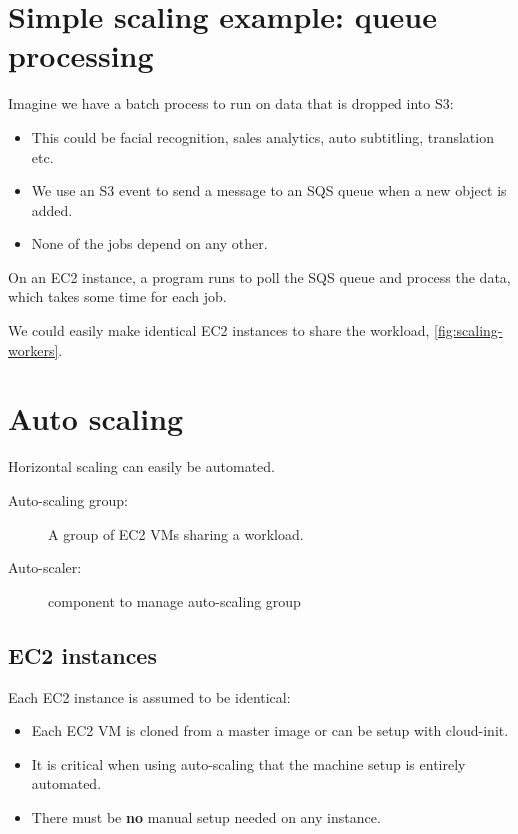 \documentclass[slides]{pgnotes}
\begin{document}
\section{Simple scaling example: queue processing}

Imagine we have a batch process to run on data that is dropped into S3:
\begin{itemize}
\item This could be facial recognition, sales analytics, auto subtitling, translation etc.
\item We use an S3 event to send a message to an SQS queue when a new object is added.
\item None of the jobs depend on any other.
\end{itemize}

On an EC2 instance, a program runs to poll the SQS queue and process the data, which takes some time for each job.


We could easily make identical EC2 instances to share the workload, \autoref{fig:scaling-workers}.


\section{Auto scaling}

Horizontal scaling can easily be automated.
\begin{description}
\item[Auto-scaling group:] A group of EC2 VMs sharing a workload.
\item[Auto-scaler:] component to manage auto-scaling group
\end{description}

\subsection{EC2 instances}

Each EC2 instance is assumed to be identical:
\begin{itemize}
\item Each EC2 VM is cloned from a master image or can be setup with cloud-init.
\item It is critical when using auto-scaling that the machine setup is entirely automated.
\item There must be \textbf{no} manual setup needed on any instance.
\end{itemize}
\end{document}
